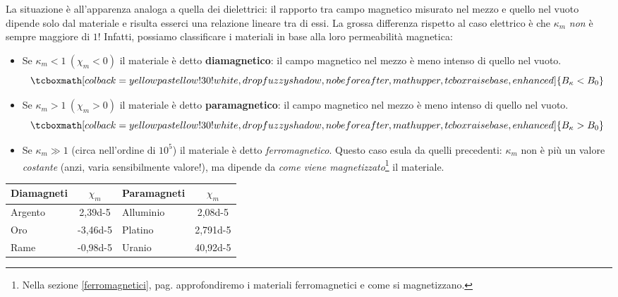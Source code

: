 La situazione è all'apparenza analoga a quella dei dielettrici: il rapporto tra campo magnetico misurato nel mezzo e quello nel vuoto dipende solo dal materiale e risulta esserci una relazione lineare tra di essi.
La grossa differenza rispetto al caso elettrico è che $\kappa_m$ \textit{non} è sempre maggiore di $1$! Infatti, possiamo classificare i materiali in base alla loro permeabilità magnetica:
\begin{itemize}
	\item Se $\kappa_m<1\ (\chi_m<0)$ il materiale è detto \textbf{diamagnetico}: il campo magnetico nel mezzo è meno intenso di quello nel vuoto.
	\begin{equation}
		\tcboxmath[colback=yellowpastellow!30!white,drop fuzzy shadow, nobeforeafter, math upper, tcbox raise base, enhanced]{B_{\kappa}<B_0}
	\end{equation}
	\item Se $\kappa_m>1\ (\chi_m>0)$ il materiale è detto \textbf{paramagnetico}: il campo magnetico nel mezzo è meno intenso di quello nel vuoto.
	\begin{equation}
		\tcboxmath[colback=yellowpastellow!30!white,drop fuzzy shadow, nobeforeafter, math upper, tcbox raise base, enhanced]{B_{\kappa}>B_0}
	\end{equation}
	\item Se $\kappa_m\gg 1$ (circa nell'ordine di $10^5$) il materiale è detto \textit{ferromagnetico}. Questo caso esula da quelli precedenti: $\kappa_m$ non è più un valore \textit{costante} (anzi, varia sensibilmente valore!), ma dipende da \textit{come viene magnetizzato}\footnote{Nella sezione \ref{ferromagnetici}, pag. \pageref{ferromagnetici} approfondiremo i materiali ferromagnetici e come si magnetizzano.} il materiale.
\end{itemize}
\begin{examplewt}
	\begin{center}
		\begin{tabular}{l|c|l|c}
			\textbf{Diamagneti} & $\chi_m$ & \textbf{Paramagneti} & $\chi_m$\\
			\hline
			Argento & \num{2,39d-5} 	& Alluminio & \num{2,08d-5}\\
			Oro 	& \num{-3,46d-5} 	& Platino 	& \num{2,791d-5}\\
			Rame 	& \num{-0,98d-5} 	& Uranio 	& \num{40,92d-5}
		\end{tabular}
	\end{center}
\end{examplewt}
